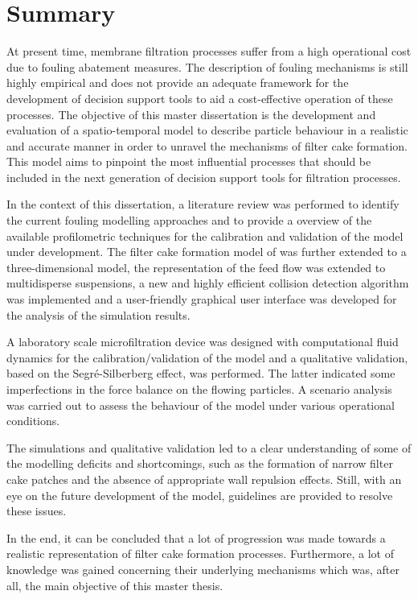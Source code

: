 \chapter[Summary]{Summary}
\vspace{-2cm}
At present time, membrane filtration processes suffer from a high operational cost due to fouling abatement measures. The description of fouling mechanisms is still highly empirical and does not provide an adequate framework for the development of decision support tools to aid a cost-effective operation of these processes. The objective of this master dissertation is the development and evaluation of a spatio-temporal model to describe particle behaviour in a realistic and accurate manner in order to unravel the mechanisms of filter cake formation. This model aims to pinpoint the most influential processes that should be included in the next generation of decision support tools for filtration processes. \par In the context of this dissertation, a literature review was performed to identify the current fouling modelling approaches and to provide a overview of the available profilometric techniques for the calibration and validation of the model under development. The filter cake formation model of \cite{Ghijs2014} was further extended to a three-dimensional model, the representation of the feed flow was extended to multidisperse suspensions, a new and highly efficient collision detection algorithm was implemented and a user-friendly graphical user interface was developed for the analysis of the simulation results. \par 
A laboratory scale microfiltration device was designed with computational fluid dynamics for the calibration/validation of the model and a qualitative validation, based on the Segr\'e-Silberberg effect, was performed. The latter indicated some imperfections in the force balance on the flowing particles. A scenario analysis was carried out to assess the behaviour of the model under various operational conditions. \par
The simulations and qualitative validation led to a clear understanding of some of the modelling deficits and shortcomings, such as the formation of narrow filter cake patches and the absence of appropriate wall repulsion effects. Still, with an eye on the future development of the model, guidelines are provided to resolve these issues. \par
In the end, it can be concluded that a lot of progression was made towards a realistic representation of filter cake formation processes. Furthermore, a lot of knowledge was gained concerning their underlying mechanisms which was, after all, the main objective of this master thesis.